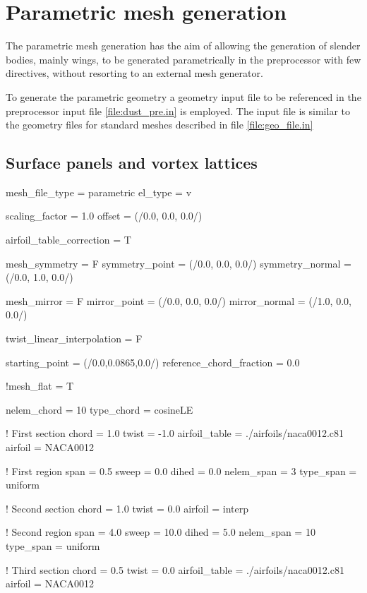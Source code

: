 \section{Parametric mesh generation}
\label{sec:Parametric_mesh_generation}

The parametric mesh generation has the aim of allowing the generation of slender bodies, mainly wings, 
to be generated parametrically in the preprocessor with few directives, without resorting to an external mesh generator. 

To generate the parametric geometry a geometry input file to be referenced in the preprocessor input file 
\ref{file:dust_pre.in} is employed. The input file is similar to the geometry files for standard meshes described 
in file \ref{file:geo_file.in}


\subsection{Surface panels and vortex lattices}

\begin{inputfile}[frame=single, caption={paramtetric\_geo\_file.in}, label={file:parametric_geo_file.in}]
mesh_file_type = parametric
el_type = v

scaling_factor = 1.0
offset = (/0.0, 0.0, 0.0/)

airfoil_table_correction = T

mesh_symmetry = F
symmetry_point  = (/0.0, 0.0, 0.0/)
symmetry_normal = (/0.0, 1.0, 0.0/)

mesh_mirror = F
mirror_point  = (/0.0, 0.0, 0.0/)
mirror_normal = (/1.0, 0.0, 0.0/)

twist_linear_interpolation = F

starting_point = (/0.0,0.0865,0.0/)
reference_chord_fraction = 0.0

!mesh_flat = T

nelem_chord = 10
type_chord = cosineLE

! First section
chord = 1.0
twist = -1.0
airfoil_table = ./airfoils/naca0012.c81
airfoil = NACA0012

! First region
span = 0.5
sweep = 0.0
dihed = 0.0
nelem_span = 3 
type_span = uniform

! Second section
chord = 1.0
twist = 0.0
airfoil = interp

! Second region
span = 4.0
sweep = 10.0
dihed = 5.0
nelem_span = 10 
type_span = uniform

! Third section
chord = 0.5
twist =  0.0
airfoil_table = ./airfoils/naca0012.c81
airfoil = NACA0012

\end{inputfile}

